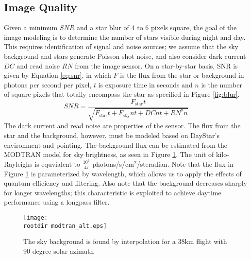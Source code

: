 \documentclass[twocolumn,letterpaper]{IEEEAerospace2012}
\newcommand{\rootdir}{./Figures/}
\newcommand{\RN}{\mathit{RN}}
\newcommand{\DC}{\mathit{DC}}
\newcommand{\SNR}{\mathit{SNR}}
\newcommand{\sub}[1]{\text{#1}} %
\begin{document}
\subsection{Image Quality}
Given a minimum $\SNR$ and a star blur of 4 to 6 pixels square, the goal of the image modeling is to determine the number of stars visible during night and day. This requires identification of signal and noise sources; we assume that the sky background and stars generate Poisson shot noise, and also consider dark current $\DC$ and read noise $\RN$ from the image sensor. On a star-by-star basis, SNR is given by Equation \ref{eq:snr}, in which $F$ is the flux from the star or background in photons per second per pixel, $t$ is exposure time in seconds and $n$ is the number of square pixels that totally encompass the star as specified in Figure \ref{fig:blur}.
\begin{equation}
    \label{eq:snr}
    \SNR = \frac{F_{\sub{star}}t}{\sqrt{F_{\sub{star}} t + F_{\sub{sky}} n t + \DC n t + \RN^2 n }}
\end{equation}
The dark current and read noise are properties of the sensor. The flux from the star and the background, however, must be modeled based on DayStar's environment and pointing. The background flux can be estimated from the MODTRAN \cite{young2012} model for sky brightness, as seen in Figure \ref{fig:modtran}. The unit of kilo-Rayleighs is equvialent to $\frac{10^{9}}{4\pi}$ photons/s/cm$^2$/steradian. Note that the flux in Figure \ref{fig:modtran} is parameterized by wavelength, which allows us to apply the effects of quantum efficiency and filtering. Also note that the background decreases sharply for longer wavelengths; this characteristic is exploited to achieve daytime performance using a longpass filter.
\begin{figure}[H]
    \centering
    \texttt{[image: \\rootdir modtran\_alt.eps]}
    \caption{The sky background is found by interpolation for a 38km flight with 90 degree solar azimuth}
    \label{fig:modtran}
\end{figure}
\end{document}
